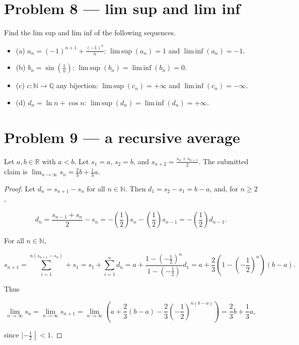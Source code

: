\section{Problem 8 --- lim sup and lim inf}

Find the lim sup and lim inf of the following sequences.

\begin{itemize}
\tightlist
\item
  (a) \(a_{n} = \left( {- 1} \right)^{n + 1} + \frac{\left( {- 1} \right)^{n}}{n}\): \(\operatorname{lim\, sup}\left( a_{n} \right) = 1\) and \(\operatorname{lim\, inf}\left( a_{n} \right) = - 1\).
\item
  (b) \(b_{n} = \sin\left( \frac{1}{n} \right)\): \(\operatorname{lim\, sup}\left( b_{n} \right) = \operatorname{lim\, inf}\left( b_{n} \right) = 0\).
\item
  (c) \(c:\mathbb{N}\rightarrow\mathbb{Q}\) any bijection: \(\operatorname{lim\, sup}\left( c_{n} \right) = + \infty\) and \(\operatorname{lim\, inf}\left( c_{n} \right) = - \infty\).
\item
  (d) \(d_{n} = \ln n + \cos n\): \(\operatorname{lim\, sup}\left( d_{n} \right) = \operatorname{lim\, inf}\left( d_{n} \right) = + \infty\).
\end{itemize}

\clearpage

\section{Problem 9 --- a recursive average}

Let \(a,b \in \mathbb{R}\) with \(a < b\). Let \(s_{1} = a\), \(s_{2} = b\), and \(s_{n + 2} = \frac{s_{n} + s_{n + 1}}{2}\). The submitted claim is \(\lim_{n\rightarrow\infty}s_{n} = \frac{2}{3}b + \frac{1}{3}a\).

\begin{proof}

Let \(d_{n} = s_{n + 1} - s_{n}\) for all \(n \in \mathbb{N}\). Then \(d_{1} = s_{2} - s_{1} = b - a\), and, for \(n \geq 2\),

\[d_{n} = \frac{s_{n - 1} + s_{n}}{2} - s_{n} = - \left( \frac{1}{2} \right)s_{n} - \left( \frac{1}{2} \right)s_{n - 1} = - \left( \frac{1}{2} \right)d_{n - 1}.\]

For all \(n \in \mathbb{N}\),

\[s_{n + 1} = \sum\limits_{i = 1}^{n{({s_{n + 1} - s_{n}})}} + s_{1} = s_{1} + \sum\limits_{i = 1}^{n}d_{n} = a + \frac{1 - \left( {- \frac{1}{2}} \right)^{n}}{1 - \left( {- \frac{1}{2}} \right)}d_{1} = a + \frac{2}{3}\left( {1 - \left( {- \frac{1}{2}} \right)^{n}} \right)\left( {b - a} \right).\]

Thus

\[\lim\limits_{n\rightarrow\infty}s_{n} = \lim\limits_{n\rightarrow\infty}s_{n + 1} = \lim\limits_{n\rightarrow\infty}\left( {a + \frac{2}{3}\left( {b - a} \right) - \frac{2}{3}\left( {- \frac{1}{2}} \right)^{n{({b - a})}}} \right) = \frac{2}{3}b + \frac{1}{3}a,\]

since \(\left. | - \frac{1}{2} \middle| < 1 \right.\).

\end{proof}


